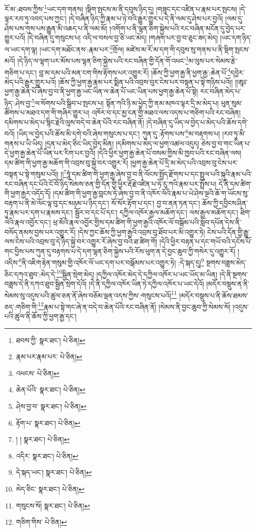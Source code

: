 རོ་མ་:ཐབས་ཀྱིས་\footnote{ཐབས་ཀྱི་  སྣར་ཐང་།  པེ་ཅིན། }ཡང་དག་གནས། །སྡིག་སྤངས་མ་ནི་དབུས་ཉིད་དུ། །གཟུང་དང་འཛིན་པ་རྣམ་པར་སྤངས། །དེ་ལྟར་རབ་ཏུ་འབད་པས་ཀྱང་། །དེ་བཞིན་ཉིད་ཀྱི་རྣམ་པ་ཉེ་བའི་རྒྱུར་གྱུར་པ་དེ་ནི་ལམ་དུ་ཤེས་པར་བྱའོ། །ལམ་དུ་ཤེས་པས་གུས་པས་རྒྱུན་མི་འཆད་པ་ནི་ལམ་མོ། །འགོག་པ་ནི་ལྷན་ཅིག་སྐྱེས་པའི་རང་བཞིན་མངོན་དུ་བྱེད་པར་གྱུར་པའོ། །དེ་བཞིན་དུ་གསུངས་པ། འདི་ལ་བསལ་བྱ་ཅི་ཡང་མེད། །གཞག་པར་བྱ་བ་ཅུང་ཟད་མེད། །ཡང་དག་ཉིད་ལ་ཡང་དག་ལྟ། །ཡང་དག་མཐོང་ནས་:རྣམ་པར་\footnote{རྣམ་པར་རྣམ་པར་  པེ་ཅིན། }གྲོལ། མཛེས་མ་རོ་མ་དག་གི་དབུས་སུ་གནས་པ་ནི་སྡིག་སྤངས་མའོ། །དེ་ཉིད་ལ་ལྷག་པར་མོས་པས་ལྷན་ཅིག་སྐྱེས་པའི་རང་བཞིན་གྱི་དོན་གོ་འཕང་\footnote{འཕངས་  པེ་ཅིན། }མ་ལུས་པར་སེམས་རྩེ་གཅིག་པ་དང་། བླ་མ་དམ་པའི་མན་ངག་གིས་རྟོགས་པར་འགྱུར་རོ། །ཆོས་ཀྱི་ཕྱག་རྒྱ་ནི་ཕྱག་རྒྱ་:ཆེན་པོ་\footnote{ཆེན་པོའི་  སྣར་ཐང་།  པེ་ཅིན། }དབྱེར་མེད་པའི་རྒྱུར་གྱུར་པའོ། །ཆོས་ཀྱི་ཕྱག་རྒྱ་རྣམ་པར་སྨིན་པའི་འབྲས་བུར་ངེས་པར་བསྟན་པ་སྟེ་གཉིས་པའོ།། །།ཨཱཿ་ཕྱག་རྒྱ་ཆེན་པོ་ཞེས་བྱ་བ་ནི་ཕྱག་རྒྱ་ཡང་ཡིན་ལ་ཆེན་པོ་ཡང་ཡིན་པས་ཕྱག་རྒྱ་ཆེན་པོ་སྟེ། རང་བཞིན་མེད་པ་ཉིད་:ཤེས་བྱ་\footnote{ཤེས་བྱ་བ་  སྣར་ཐང་།  པེ་ཅིན། }ལ་སོགས་པའི་སྒྲིབ་པ་སྤངས་པ། སྟོན་ཀའི་ཉི་མ་ཕྱེད་ཀྱི་ནམ་མཁའ་ལྟར་དྲི་མ་མེད་པ། ཕུན་སུམ་ཚོགས་པ་མཐའ་དག་གི་གཞིར་གྱུར་པ། འཁོར་བ་དང་མྱ་ངན་གྱི་མཐའ་ལས་འདས་པ་གཅིག་པའི་རང་བཞིན། དམིགས་པ་མེད་པ་སྙིང་རྗེའི་ལུས་བདེ་བ་ཆེན་པོའི་རང་བཞིན་ནོ། །དེ་བཞིན་དུ་ཡིད་ལ་བྱེད་པ་མེད་པའི་ཆོས་དགེ་བའོ། །ཡིད་ལ་བྱེད་པའི་ཆོས་མི་དགེ་བའི་ཞེས་གསུངས་པ་དང་། ཀུན་དུ་:རྟོགས་པས་\footnote{རྟོག་པ་  སྣར་ཐང་།  པེ་ཅིན། }མ་བརྟགས་པ། །རབ་ཏུ་མི་གནས་པ་ཡི་ཡིད། །དྲན་པ་མེད་ཅིང་ཡིད་བྱེད་མིན། །དམིགས་པ་མེད་ལ་ཕྱག་འཚལ་འདུད། ཅེས་བྱ་བ་གང་ཡིན་པ་དེ་ཕྱག་རྒྱ་ཆེན་པོ་ཡིན་པར་རིག་པར་བྱའོ། །དེའི་ཕྱིར་ཕྱག་རྒྱ་ཆེན་པོ་བསམ་གྱིས་མི་ཁྱབ་པའི་རང་བཞིན་ལས། དམ་ཚིག་གི་ཕྱག་རྒྱ་མཆོག་གི་འབྲས་བུ་སྐྱེ་བར་འགྱུར་རོ། །ཕྱག་རྒྱ་ཆེན་པོ་དྲི་མ་མེད་པའི་འབྲས་བུ་ངེས་པར་བསྟན་པ་སྟེ་གསུམ་པའོ།། །།\footnote{། །  སྣར་ཐང་།  པེ་ཅིན། }ཧཱུཾ་དམ་ཚིག་གི་ཕྱག་རྒྱ་ཞེས་བྱ་བ་ནི་ལོངས་སྤྱོད་རྫོགས་པ་དང་སྤྲུལ་པའི་སྐུའི་རྣམ་པའི་རང་བཞིན་དང་པོའི་ངོ་བོ་ཉིད་སེམས་ཅན་གྱི་དོན་གྱི་ཕྱིར་རྡོ་རྗེ་འཛིན་པ་ཧེ་རུ་ཀའི་རྣམ་པར་སྤྲོས་པ། དེ་ནི་དམ་ཚིག་གི་ཕྱག་རྒྱར་འདོད་དོ། །དམ་ཚིག་གི་ཕྱག་རྒྱ་བླངས་ཏེ་ཞེས་བྱ་བ་ནི་འཁོར་ལོའི་རྣམ་པ་ཡེ་ཤེས་ལྔའི་ཆོ་ག་ཡོངས་སུ་བརྟག་པ་ནི་མེ་ལོང་ལྟ་བུ་དང་མཉམ་པ་ཉིད་དང་། སོ་སོར་རྟོག་པ་དང་། བྱ་བ་ནན་ཏན་དང་། ཆོས་ཀྱི་དབྱིངས་ཤིན་ཏུ་རྣམ་པར་དག་པ་རྣམས་དང་། སྦྱོར་བ་དང་པོ་དང་། དཀྱིལ་འཁོར་རྒྱལ་མཆོག་དང་། ལས་རྒྱལ་མཆོག་དང་། ཐིག་ལེའི་རྣལ་འབྱོར་དང་། ཕྲ་མོའི་རྣལ་འབྱོར་གྱིས་དམ་ཚིག་གི་ཕྱག་རྒྱའི་འཁོར་ལོ་བསྒོམ་པའི་སློབ་དཔོན་དེས་ནི་བསོད་ནམས་བྱས་པར་འགྱུར་རོ། །དེས་ཀྱང་ཆོས་ཀྱི་ཕྱག་རྒྱའི་འབྲས་བུ་ཐོབ་པར་མི་འགྱུར་ཏེ། ངེས་པའི་དོན་གྱི་རྒྱུ་ལས་ངེས་པའི་འབྲས་བུ་དེ་ཉིད་སྐྱེ་བར་འགྱུར་རོ་ཞེས་བྱ་བའི་ཐ་ཚིག་གོ། །དེའི་ཕྱིར་བརྟན་པ་དང་གཡོ་བའི་དངོས་པོ་གང་བྱིས་པས་ཀུན་དུ་བརྟགས་པ་དེ་དག་ལྷན་ཅིག་སྐྱེས་པའི་རོས་ཕུག་ན་དེ་བྱང་ཆུབ་ཀྱི་གསེར་དུ་འགྱུར་རོ། །འདིས་\footnote{འདིར་  སྣར་ཐང་།  པེ་ཅིན། }ནི་འཇིག་རྟེན་གསུམ་གྱི་འཁོར་ལོ་ཡང་དག་པར་བསྒོམས་པར་འགྱུར་ཏེ། :དེ་སྐད་དུ།\footnote{དེ་སྐད་ཡང་།  སྣར་ཐང་།  པེ་ཅིན། } སྔགས་བཟླས་མེད་ཅིང་དཀའ་ཐུབ་:མེད་དེ་\footnote{མེད་ཅིང་  སྣར་ཐང་།  པེ་ཅིན། }སྦྱིན་སྲེག་མེད། །དཀྱིལ་འཁོར་མེད་དེ་དཀྱིལ་འཁོར་པ་ཡང་ཡོད་མ་ཡིན། །དེ་ནི་སྔགས་བཟླས་དེ་ནི་དཀའ་ཐུབ་སྦྱིན་སྲེག་དེའོ། །དེ་ནི་དཀྱིལ་འཁོར་ཡིན་ཏེ་དཀྱིལ་འཁོར་པ་ཡང་དེའོ། །མདོར་བསྡུས་ན་ནི་སེམས་སུ་འདུས་པའི་ཚུལ་ཅན་ནོ་ཞེས་བཅོམ་ལྡན་འདས་ཀྱིས་:གསུངས་པའོ།\footnote{གསུངས་སོ།  སྣར་ཐང་།  པེ་ཅིན། } །མདོར་བསྡུས་པ་ནི་ཆོས་ཐམས་ཅད་:གཅིག་གི་\footnote{གཅིག་གིས་  པེ་ཅིན། }རྣམ་པ་སྟེ་གང་ཞེ་ན་བདེ་བ་ཆེན་པོའི་རང་བཞིན་ནོ། །སེམས་ནི་བྱང་ཆུབ་ཀྱི་སེམས་སོ། །འདུས་པའི་ཚུལ་ནི་ཆོས་ཀྱི་ཕྱག་རྒྱ་དང་། 